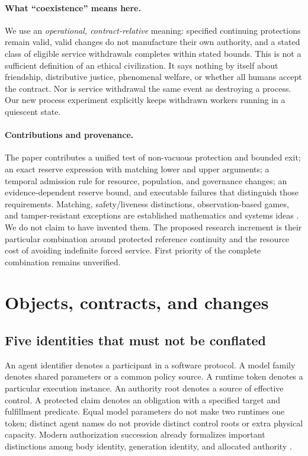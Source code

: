 \documentclass[11pt,a4paper]{article}
\theoremstyle{definition}\newtheorem{definition}{Definition}
\begin{document}
\paragraph{What ``coexistence'' means here.}
We use an \emph{operational, contract-relative} meaning: specified continuing protections remain valid, valid changes do not manufacture their own authority, and a stated class of eligible service withdrawals completes within stated bounds. This is not a sufficient definition of an ethical civilization. It says nothing by itself about friendship, distributive justice, phenomenal welfare, or whether all humans accept the contract. Nor is service withdrawal the same event as destroying a process. Our new process experiment explicitly keeps withdrawn workers running in a quiescent state.

\paragraph{Contributions and provenance.}
The paper contributes a unified test of non-vacuous protection and bounded exit; an exact reserve expression with matching lower and upper arguments; a temporal admission rule for resource, population, and governance changes; an evidence-dependent reserve bound, and executable failures that distinguish those requirements. Matching, safety/liveness distinctions, observation-based games, and tamper-resistant exceptions are established mathematics and systems ideas \cite{hall,alpern,chatterjee,cecchetti}. We do not claim to have invented them. The proposed research increment is their particular combination around protected reference continuity and the resource cost of avoiding indefinite forced service. First priority of the complete combination remains unverified.

\section{Objects, contracts, and changes}
\label{sec:objects}
\subsection{Five identities that must not be conflated}
An agent identifier denotes a participant in a software protocol. A model family denotes shared parameters or a common policy source. A runtime token denotes a particular execution instance. An authority root denotes a source of effective control. A protected claim denotes an obligation with a specified target and fulfillment predicate. Equal model parameters do not make two runtimes one token; distinct agent names do not provide distinct control roots or extra physical capacity. Modern authorization succession already formalizes important distinctions among body identity, generation identity, and allocated authority \cite{zhu-wang}.
\end{document}
